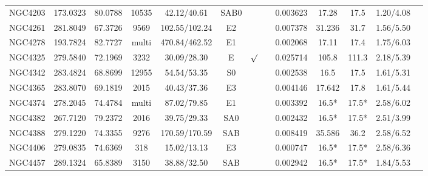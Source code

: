 \documentclass[iop]{emulateapj}
\begin{document}
\begin{table}
\begin{tabular}{lcccccccccccc}
NGC4203 & 173.0323 & 80.0788 & 10535  & 42.12/40.61  & SAB0 &   &     & 0.003623 & 17.28 & 17.5 & 1.20/4.08 \\
NGC4261 & 281.8049 & 67.3726 & 9569 & 102.55/102.24  & E2  &     &    & 0.007378 & 31.236 & 31.7 & 1.56/5.50  \\
NGC4278 & 193.7824 & 82.7727  & multi & 470.84/462.52 & E1  &      &    & 0.002068 & 17.11  & 17.4  & 1.75/6.03  \\
NGC4325 & 279.5840 & 72.1969 & 3232 & 30.09/28.30 & E & $\surd$ && 0.025714 & 105.8 & 111.3 & 2.18/5.39  \\
NGC4342 & 283.4824 & 68.8699 & 12955 & 54.54/53.35 & S0 &    &      &  0.002538 & 16.5 & 17.5 & 1.61/5.31 \\
NGC4365 & 283.8070 & 69.1819 &  2015 & 40.43/37.36 & E3 &     &    & 0.004146 & 17.642 & 17.8  &  1.61/5.44  \\
NGC4374 & 278.2045 & 74.4784  & multi & 87.02/79.85  & E1 &    &       & 0.003392 & 16.5* & 17.5* & 2.58/6.02  \\
NGC4382 & 267.7120 & 79.2372  & 2016 & 39.75/29.33  & SA0 &     &     & 0.002432 & 16.5* & 17.5* & 2.51/3.99   \\
NGC4388 & 279.1220 & 74.3355  & 9276 & 170.59/170.59 & SAB &      &    & 0.008419 & 35.586 & 36.2 & 2.58/6.52  \\
NGC4406 & 279.0835 & 74.6369 & 318    & 15.02/13.13 & E3 &        &  & 0.000747 & 16.5* & 17.5* & 2.58/6.36 \\
NGC4457 & 289.1324 & 65.8389  & 3150 & 38.88/32.50  & SAB &        &  & 0.002942 & 16.5* & 17.5* & 1.84/5.53  \\
\hline
\end{tabular}
\end{table}
\end{document}
